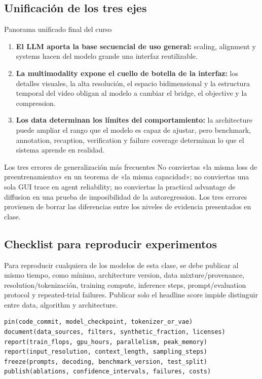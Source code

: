 \documentclass[a4paper]{article}
\begin{document}
\subsection{Unificación de los tres ejes}

\begin{importantbox}{Panorama unificado final del curso}
\begin{enumerate}
  \item \textbf{El LLM aporta la base secuencial de uso general: }scaling, alignment y systems hacen del modelo grande una interfaz reutilizable.
  \item \textbf{La multimodality expone el cuello de botella de la interfaz: }los detalles visuales, la alta resolución, el espacio bidimensional y la estructura temporal del video obligan al modelo a cambiar el bridge, el objective y la compression.
  \item \textbf{Los data determinan los límites del comportamiento: }la architecture puede ampliar el rango que el modelo es capaz de ajustar, pero benchmark, annotation, recaption, verification y failure coverage determinan lo que el sistema aprende en realidad.
\end{enumerate}
\end{importantbox}

\begin{warningbox}{Los tres errores de generalización más frecuentes}
No conviertas «la misma loss de preentrenamiento» en un teorema de «la misma capacidad»; no conviertas una sola GUI trace en agent reliability; no conviertas la practical advantage de diffusion en una prueba de imposibilidad de la autoregression. Los tres errores provienen de borrar las diferencias entre los niveles de evidencia presentados en clase.
\end{warningbox}

\subsection{Checklist para reproducir experimentos}

Para reproducir cualquiera de los modelos de esta clase, se debe publicar al mismo tiempo, como mínimo, architecture version, data mixture/provenance, resolution/tokenización, training compute, inference steps, prompt/evaluation protocol y repeated-trial failures. Publicar solo el headline score impide distinguir entre data, algorithm y architecture.

\begin{lstlisting}[caption={Lista unificada de reproducción para LLM/VLM/diffusion}]
pin(code_commit, model_checkpoint, tokenizer_or_vae)
document(data_sources, filters, synthetic_fraction, licenses)
report(train_flops, gpu_hours, parallelism, peak_memory)
report(input_resolution, context_length, sampling_steps)
freeze(prompts, decoding, benchmark_version, test_split)
publish(ablations, confidence_intervals, failures, costs)
\end{lstlisting}
\end{document}
